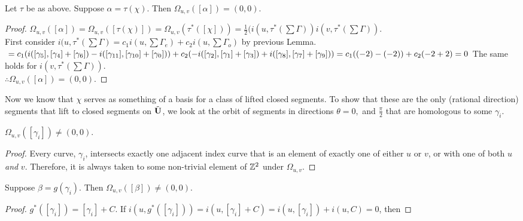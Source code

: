 \documentclass[]{article}
\begin{document}
\begin{thm}
Let $\tau$ be as above. Suppose $\alpha=\tau(\chi)$. Then $\Omega_{u,v}([\alpha])=(0,0)$. 
\begin{proof}
$\Omega_{u,v}([\alpha])=\Omega_{u,v}([\tau(\chi)])=\Omega_{u,v}(\tau^{*}([\chi]))=\frac{1}{2}(i(u,\tau^*(\sum\Gamma)) i(v,\tau^*(\sum\Gamma))$.\\
First consider $i(u,\tau^*(\sum\Gamma)=c_1 i(u,\sum
\Gamma_e)+c_2 i(u,\sum\Gamma_o)$ by previous Lemma. $\\= c_1(i([\gamma_5],[\gamma_{4}]+[\gamma_6]) - i([\gamma_{11}],[\gamma_{10}]+[\gamma_{0}]))\\+c_2(-i([\gamma_2],[\gamma_{1}]+[\gamma_{3}]) + i([\gamma_8],[\gamma_{7}]+[\gamma_{9}]) )=\\c_1((-2)-(-2))+c_2(-2+ 2 )=0\\$
The same holds for $i(v,\tau^*(\sum\Gamma)).$\\
$\therefore \Omega_{u,v}([\alpha])=(0,0)$.
\end{proof}
\end{thm}

Now we know that $\chi$ serves as something of a basis for a class of lifted closed segments. To show that these are the only (rational direction) segments that lift to closed segments on $\tilde{\mathbf{U}}$, we look at the orbit of segments in directions $\theta=0,$ and $\frac{\pi}{2}$ that are homologous to some $\gamma_i$.

\begin{lem}
$\Omega_{u,v}([\gamma_i])\neq (0,0)$.
\begin{proof}
Every curve, $\gamma_i$, intersects exactly one adjacent index curve that is an element of exactly one of either $u$ or $v$, or with one of both $u$ \emph{and} $v$. Therefore, it is always taken to some non-trivial element of $\mathbb{Z}^2$ under $\Omega_{u,v}$.
\end{proof}
\end{lem}

\begin{thm}
Suppose $\beta=g(\gamma_i)$. Then $\Omega_{u,v}([\beta])\neq (0,0)$.
\begin{proof}
$g^*([\gamma_i])=[\gamma_i]+C$.
If $i(u,g^*([\gamma_i]))=i(u,[\gamma_i]+C)=i(u,[\gamma_i])+i(u,C)=0$, then 
\end{proof}
\end{thm}
\end{document}
